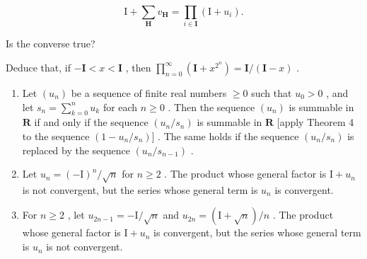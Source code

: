 \[
\mathrm{I} + \sum_ {\mathbf {H}} v _ {\mathbf {H}} = \prod_ {i \in \mathbf {I}} (\mathrm{I} + u _ {i}).
\]

Is the converse true?

Deduce that, if \(-\mathbf{I} < x < \mathbf{I}\) , then \(\prod_{n=0}^{\infty} (\mathbf{I} + x^{2^n}) = \mathbf{I} / (\mathbf{I} - x)\) .

\begin{enumerate}
\def\labelenumi{\arabic{enumi})}
\setcounter{enumi}{19}
\item
  Let \((u_n)\) be a sequence of finite real numbers \(\geqslant 0\) such that \(u_0 > 0\) , and let \(s_n = \sum_{k=0}^{n} u_k\) for each \(n \geqslant 0\) . Then the sequence \((u_n)\) is summable in \(\mathbf{R}\) if and only if the sequence \((u_n / s_n)\) is summable in \(\mathbf{R}\) {[}apply Theorem 4 to the sequence \((1 - u_n / s_n)]\) . The same holds if the sequence \((u_n / s_n)\) is replaced by the sequence \((u_n / s_{n-1})\) .
\item
  Let \(u_{n} = (-\mathrm{I})^{n} / \sqrt{n}\) for \(n \geqslant 2\) . The product whose general factor is \(\mathrm{I} + u_{n}\) is not convergent, but the series whose general term is \(u_{n}\) is convergent.
\item
  For \(n \geqslant 2\) , let \(u_{2n-1} = -\mathrm{I}/\sqrt{n}\) and \(u_{2n} = (\mathrm{I} + \sqrt{n})/n\) . The product whose general factor is \(\mathrm{I} + u_n\) is convergent, but the series whose general term is \(u_n\) is not convergent.
\end{enumerate}


